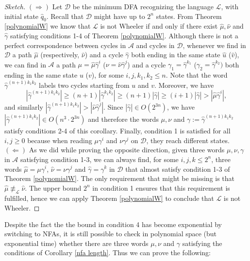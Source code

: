 \documentclass[runningheads]{llncs}
\begin{document}
\begin{proof}[Sketch]
 $(\Longrightarrow)$ Let $\mathcal D$ be the minimum DFA recognizing the language $\mathcal L$, with initial state $\hat q_0$. Recall that $\mathcal D$ might have up to $2^n$ states. From Theorem \ref{polynomialW} we know that $\mathcal L$ is not Wheeler if and only if there exist $\hat\mu, \hat\nu$ and $\hat\gamma$ satisfying conditions 1-4 of Theorem \ref{polynomialW}. 
 Although there is not a perfect correspondence between cycles in $\mathcal A$ and cycles in $\mathcal D$, whenever we find in $\mathcal D$ a path $\hat\mu$ (respectively, $\hat\nu$) and a cycle $\hat\gamma$ both ending in the same state $\hat u$ ($\hat v$), we can find in $\mathcal A$ a path $\mu = \hat\mu \hat\gamma^i$  ($\nu = \hat\nu \hat\gamma^j$) and a cycle $\gamma_1 = \hat\gamma^{k_1}$ ($\gamma_2 = \hat\gamma^{k_2})$ both ending in the same state $u$ ($v$), for some $i,j,k_1,k_2 \le n$. 
 Note that the word $\hat\gamma^{(n+1)k_1k_2}$ labels two cycles starting from $u$ and $v$. Moreover, we have 
 \[
 |\hat\gamma^{(n+1)k_1k_2}| \ge (n+1) |\hat\gamma^{k_1k_2}| \ge (n+1) |\hat\gamma| \ge (i+1) |\hat\gamma| > |\hat\mu\hat\gamma^i|,
 \]
 and similarly $|\hat\gamma^{(n+1)k_1k_2}|> |\hat\nu\hat\gamma^j|$. Since $|\hat\gamma| \in O(2^{3n})$, we have $|\hat\gamma^{(n+1)k_1k_2}| \in O(n^3 \cdot 2^{3n})$ and therefore the words $\mu, \nu$ and $\gamma := \hat\gamma^{(n+1)k_1k_2}$ satisfy conditions 2-4 of this corollary. Finally, condition 1 is satisfied for all $i,j \ge 0$ because when reading $\mu\gamma^i$ and $\nu\gamma^j$ on $\mathcal D$, they reach different states.\\ 
 $(\Longleftarrow)$ 
 As we did while proving the opposite direction, given three words $\mu, \nu, \gamma$ in $\mathcal A$ satisfying condition 1-3, we can always find, for some $i,j,k \le 2^n$, three words $\hat\mu = \mu\gamma^i$, $\hat\nu = \nu\gamma^j$ and $\hat\gamma = \gamma^k$ in $\mathcal D$ that almost satisfy condition 1-3 of Theorem \ref{polynomialW}. The only requirement that might be missing is that $\hat\mu \not\equiv_\mathcal L \hat\nu$. 
 The upper bound $2^n$ in condition 1 ensures that this requirement is fulfilled, hence we can apply Theorem \ref{polynomialW} to conclude that $\mathcal L$ is not Wheeler.
\end{proof}

Despite the fact the the bound in condition 4 has become exponential by switching to NFAs, it is still possible to check in polynomial space (but exponential time) whether there are three words $\mu, \nu$ and $\gamma$ satisfying the conditions of Corollary \ref{nfa length}. Thus we can prove the following:
\end{document}
